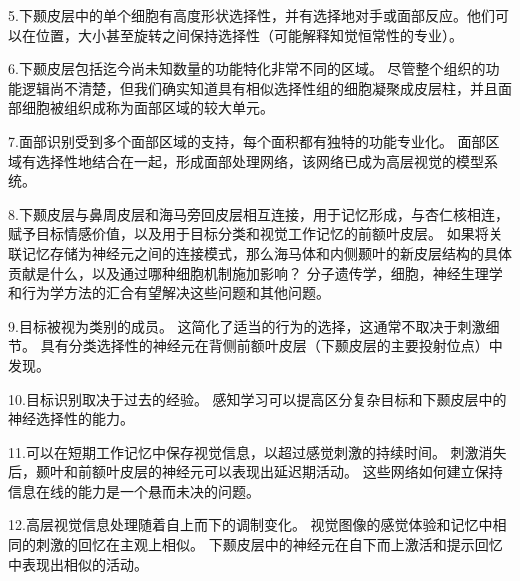 5.下颞皮层中的单个细胞有高度形状选择性，并有选择地对手或面部反应。他们可以在位置，大小甚至旋转之间保持选择性（可能解释知觉恒常性的专业）。


6.下颞皮层包括迄今尚未知数量的功能特化非常不同的区域。
尽管整个组织的功能逻辑尚不清楚，但我们确实知道具有相似选择性组的细胞凝聚成皮层柱，并且面部细胞被组织成称为面部区域的较大单元。


7.面部识别受到多个面部区域的支持，每个面积都有独特的功能专业化。
面部区域有选择性地结合在一起，形成面部处理网络，该网络已成为高层视觉的模型系统。


8.下颞皮层与鼻周皮层和海马旁回皮层相互连接，用于记忆形成，与杏仁核相连，赋予目标情感价值，以及用于目标分类和视觉工作记忆的前额叶皮层。
如果将关联记忆存储为神经元之间的连接模式，那么海马体和内侧颞叶的新皮层结构的具体贡献是什么，以及通过哪种细胞机制施加影响？
分子遗传学，细胞，神经生理学和行为学方法的汇合有望解决这些问题和其他问题。


9.目标被视为类别的成员。
这简化了适当的行为的选择，这通常不取决于刺激细节。
具有分类选择性的神经元在背侧前额叶皮层（下颞皮层的主要投射位点）中发现。


10.目标识别取决于过去的经验。
感知学习可以提高区分复杂目标和下颞皮层中的神经选择性的能力。


11.可以在短期工作记忆中保存视觉信息，以超过感觉刺激的持续时间。
刺激消失后，颞叶和前额叶皮层的神经元可以表现出延迟期活动。
这些网络如何建立保持信息在线的能力是一个悬而未决的问题。


12.高层视觉信息处理随着自上而下的调制变化。
视觉图像的感觉体验和记忆中相同的刺激的回忆在主观上相似。
下颞皮层中的神经元在自下而上激活和提示回忆中表现出相似的活动。


